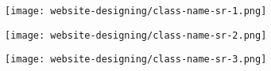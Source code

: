 \begin{figure}[ht]
\caption{Adding Class Name to HTML Element}
\label{class-name-sr}
\centering
	\begin{subfigure}{.49\linewidth}
	\centering
	\texttt{[image: website-designing/class-name-sr-1.png]}
	\end{subfigure}
	\begin{subfigure}{0.49\linewidth}
	\centering
	\texttt{[image: website-designing/class-name-sr-2.png]}
	\end{subfigure}
	\begin{subfigure}{0.49\linewidth}
	\centering
	\texttt{[image: website-designing/class-name-sr-3.png]}
	\end{subfigure}
\end{figure}

